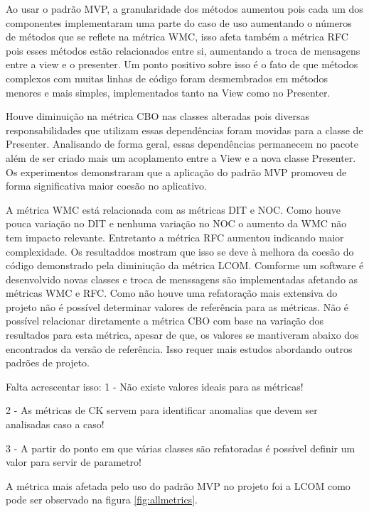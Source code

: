 Ao usar o padrão MVP, a granularidade dos métodos aumentou pois cada um dos
componentes implementaram uma parte do caso de uso aumentando o números de
métodos que se reflete na métrica WMC, isso afeta também a métrica RFC pois
esses métodos estão relacionados entre si, aumentando a troca de mensagens entre
a view e o presenter. Um ponto positivo sobre isso é o fato de que métodos 
complexos com muitas linhas de código foram desmembrados em métodos menores e
mais simples, implementados tanto na View como no Presenter.

Houve diminuição na métrica CBO nas classes alteradas pois diversas
responsabilidades que utilizam essas dependências foram movidas para a classe de
Presenter. Analisando de forma geral, essas dependências permanecem no pacote
além de ser criado mais um acoplamento entre a View e a nova classe Presenter.
Os experimentos demonstraram que a aplicação do padrão MVP promoveu de forma
significativa maior coesão no aplicativo. 

A métrica WMC está relacionada com as métricas DIT e NOC. Como houve pouca
variação no DIT e nenhuma variação no NOC o aumento da WMC não tem impacto
relevante. Entretanto a métrica RFC aumentou indicando maior complexidade. Os
resultaddos mostram que isso se deve à melhora da coesão do código demonstrado pela
diminiução da métrica LCOM. Comforme um software é desenvolvido novas classes e
troca de menssagens são implementadas afetando as métricas WMC e RFC. Como não
houve uma refatoração mais extensiva do projeto não é possível determinar
valores de referência para as métricas. Não é possível relacionar diretamente a
métrica CBO com base na variação dos resultados para esta métrica, apesar de
que, os valores se mantiveram abaixo dos encontrados da versão de referência.
Isso requer mais estudos abordando outros padrões de projeto. 

Falta acrescentar isso:
 1 - Não existe valores ideais para as métricas!
 
 2 - As métricas de CK servem para identificar anomalias que devem ser
 analisadas caso a caso!
 
 3 - A partir do ponto em que várias classes são refatoradas é
 possível definir um valor para servir de parametro!


A métrica mais afetada pelo uso do padrão MVP no projeto foi a LCOM como
pode ser observado na figura \ref{fig:allmetrics}.

